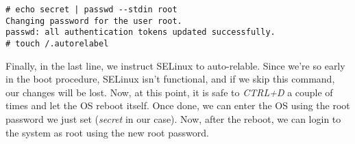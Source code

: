 \vspace{-15pt}
\begin{verbatim}
# echo secret | passwd --stdin root
Changing password for the user root.
passwd: all authentication tokens updated successfully. 
# touch /.autorelabel
\end{verbatim}
\vspace{-10pt}

\noindent
Finally, in the last line, we instruct SELinux to auto-relable. Since we're so early in the boot procedure, SELinux isn't functional, and if we skip this command, our changes will be lost. Now, at this point, it is safe to \textit{CTRL+D} a couple of times and let the OS reboot itself. Once done, we can enter the OS using the root password we just set (\textit{secret} in our case). Now, after the reboot, we can login to the system as root using the new root password. 

